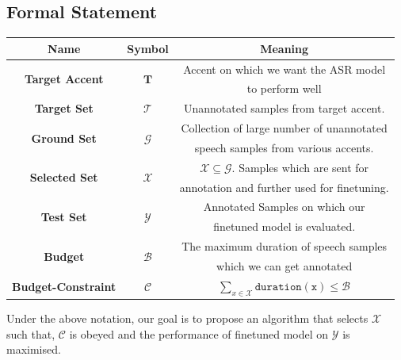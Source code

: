 \documentclass[12pt, a4paper, twoside]{article}
\begin{document}
\subsection{Formal Statement}
\begin{center}
    \begin{tabular}{ |c|c|c| }
        \hline
        \textbf{Name}                           & \textbf{Symbol}                & \textbf{Meaning}                                                  \\
        \hline
        \multirow{2}{*}{\textbf{Target Accent}} & \multirow{2}{*}{$\mathbf{T}$}  & Accent on which we want the ASR model                             \\
                                                &                                & to perform well                                                   \\
        \hline
        \textbf{Target Set}                     & $\mathcal{T}$                  & Unannotated samples from  target accent.                          \\

        \hline
        \multirow{2}{*}{\textbf{Ground Set}}    & \multirow{2}{*}{$\mathcal{G}$} & Collection of large number of unannotated                         \\
                                                &                                & speech samples from various accents.                              \\
        \hline
        \multirow{2}{*}{\textbf{Selected Set}}  & \multirow{2}{*}{$\mathcal{X}$} & $\mathcal{X} \subseteq \mathcal{G}$. Samples which are sent for   \\
                                                &                                & annotation and further used for finetuning.                       \\
        \hline
        \multirow{2}{*}{\textbf{Test Set}}      & \multirow{2}{*}{$\mathcal{Y}$} & Annotated Samples on which our                                    \\
                                                &                                & finetuned model is evaluated.                                     \\
        \hline
        \multirow{2}{*}{\textbf{Budget}}        & \multirow{2}{*}{$\mathcal{B}$} & The maximum duration of speech samples                            \\
                                                &                                & which we can get annotated                                        \\
        \hline
        \textbf{Budget-Constraint}              & $\mathcal{C}$                  & $\sum_{x \in \mathcal{X}}{\mathtt{duration(x)}} \leq \mathcal{B}$ \\
        \hline
    \end{tabular}

\end{center}
Under the above notation, our goal is to propose an algorithm that
selects $\mathcal{X}$ such that, $\mathcal{C}$ is obeyed and the performance
of finetuned model on $\mathcal{Y}$ is maximised.
\end{document}
